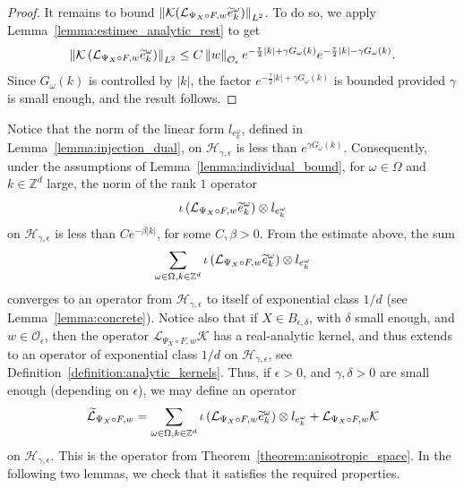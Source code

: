 \documentclass[10pt]{amsart}
\theoremstyle{definition}\newtheorem{defi}[theo]{Definition}\newtheorem{rema}[theo]{Remark}\newtheorem{exam}[theo]{Example}\newtheorem{exem}[theo]{Example}\newtheorem{nota}[theo]{Notation}
\newcommand{\n}[1]{\left\|#1\right\|}
\newcommand{\va}[1]{\left|#1\right|}
\newcommand{\clO}{\mathcal{O}}
\newcommand{\clL}{\mathcal{L}}
\newcommand{\clH}{\mathcal{H}}
\newcommand{\clK}{\mathcal{K}}
\newcommand{\bbZ}{\mathbb{Z}}
\let\oldtilde\tilde
\renewcommand*{\tilde}[1]{\mathchoice{\widetilde{#1}}{\widetilde{#1}}{\oldtilde{#1}}{\oldtilde{#1}}}
\begin{document}
\begin{proof}
It remains to bound $\n{\clK (\clL_{\Psi_X \circ F,w} \tilde{e}_{k}^\omega)}_{L^2}$. To do so, we apply Lemma~\ref{lemma:estimee_analytic_rest} to get
\begin{equation*}
\n{\clK \left(\clL_{\Psi_X \circ F,w} \tilde{e}_{k}^\omega\right)}_{L^2} \leq C \n{w}_{\clO_\epsilon} e^{ - \frac{\tau}{2} |k| + \gamma G_\omega(k)} e^{- \frac{\tau}{2} |k| - \gamma G_\omega(k)}.
\end{equation*}
Since $G_\omega(k)$ is controlled by $|k|$, the factor $e^{ - \frac{\tau}{2} |k| + \gamma G_\omega(k)}$ is bounded provided $\gamma$ is small enough, and the result follows.
\end{proof}

Notice that the norm of the linear form $l_{e_k^\omega}$, defined in Lemma~\ref{lemma:injection_dual}, on $\clH_{\gamma,\epsilon}$ is less than $e^{\gamma G_\omega(k)}$. Consequently, under the assumptions of Lemma~\ref{lemma:individual_bound}, for $\omega\in \Omega$ and $k \in \bbZ^d$ large, the norm of the rank $1$ operator
\begin{equation*}
\iota\left(\clL_{\Psi_X \circ F,w} \tilde{e}_{k}^\omega\right) \otimes l_{e_k^\omega}
\end{equation*}
on $\clH_{\gamma,\epsilon}$ is less than $Ce^{- \beta \va{k}}$, for some $C,\beta > 0$. From the estimate above, the sum
\begin{equation*}
\sum_{\omega \in \Omega, k \in \bbZ^d} \iota\left(\clL_{\Psi_X \circ F,w} \tilde{e}_{k}^\omega\right) \otimes l_{e_k^\omega}
\end{equation*}
converges to an operator from $\clH_{\gamma,\epsilon}$ to itself of exponential class $1/d$ (see Lemma~\ref{lemma:concrete}). Notice also that if $X \in B_{\epsilon,\delta}$, with $\delta$ small enough, and $w \in \clO_\epsilon$, then the operator $\clL_{\Psi_X \circ F,w} \clK $ has a real-analytic kernel, and thus extends to an operator of exponential class $1/d$ on $\clH_{\gamma,\epsilon}$, see Definition~\ref{definition:analytic_kernels}. Thus, if $\epsilon > 0$, and $\gamma, \delta > 0$ are small enough (depending on $\epsilon$), we may define an operator
\begin{equation}\label{eq:def_L_tilde}
\widetilde{\clL}_{\Psi_X \circ F,w} = \sum_{\omega \in \Omega, k \in \bbZ^d} \iota\left(\clL_{\Psi_X \circ F,w} \tilde{e}_{k}^\omega\right) \otimes l_{e_k^\omega} + \clL_{\Psi_X \circ F,w} \clK 
\end{equation}
on $\clH_{\gamma,\epsilon}$. This is the operator from Theorem~\ref{theorem:anisotropic_space}. In the following two lemmas, we check that it satisfies the required properties.
\end{document}
